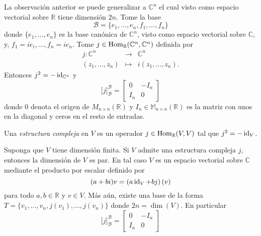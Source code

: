 \begin{obs}\label{estcomest}
La observaci\'on anterior se puede generalizar a $\mathbb{C}^n$ el cual visto como espacio vectorial sobre $\mathbb{R}$ tiene dimensi\'on $2n$. Tome la base
\[
\mathcal{B}=\{e_1,\ldots,e_n,f_1,\ldots,f_n\}
\]
donde $\{e_1,\ldots,e_n\}$ es la base can\'onica de $\mathbb{C}^n$, visto
como espacio vectorial sobre $\mathbb{C}$, y, $f_1=ie_i, \ldots, f_n=ie_n$. Tome $j\in\operatorname{Hom}_\mathbb{R}(\mathbb{C}^n,\mathbb{C}^n)$ definida por
\begin{eqnarray*}
j:\mathbb{C}^n &\longrightarrow &\mathbb{C}^n\\
(z_1,\ldots,z_n) &\longmapsto & i(z_1,\ldots,z_n).
\end{eqnarray*}
Entonces $j^2=-\operatorname{id}_{\mathbb{C}^n}$ y
\[
\Big[j\Big]^\mathcal{B}_\mathcal{B}=\left[\begin{array}{cc} 0 & -I_n\\I_n & 0\end{array}\right]
\]
donde $0$ denota el origen de $M_{n\times n}(\mathbb{R})$ y $I_n\in\mathbb{M}_{n\times n}(\mathbb{R})$ es la matriz con unos en la diagonal y ceros en el resto de entradas.
\end{obs}

\begin{defn}
Una \emph{estructura compleja} en $V$ es un operador $j\in\operatorname{Hom}_\mathbb{R}(V,V)$ tal que $j^2=-\operatorname{id}_V$.
\end{defn}

\begin{pro}\label{proestcom}
Suponga que $V$ tiene dimensi\'on finita. Si $V$ admite una estructura compleja $j$, entonces la dimensi\'on de $V$ es par. En tal caso $V$ es un espacio vectorial sobre $\mathbb{C}$ mediante el producto por escalar definido por
\[
(a+bi)v=\left(a\operatorname{id}_V+bj\right)(v)
\]
para todo $a,b\in\mathbb{R}$ y $v\in V$. M\'as a\'un, existe una base de la forma $T=\{v_1,\ldots,v_n,j(v_1),\ldots,j(v_n)\}$ donde $2n=\dim(V)$. En particular
\[
\Big[j\Big]^\mathcal{B}_\mathcal{B}=\left[\begin{array}{cc} 0 & -I_n\\I_n & 0\end{array}\right]
\]
\end{pro}

